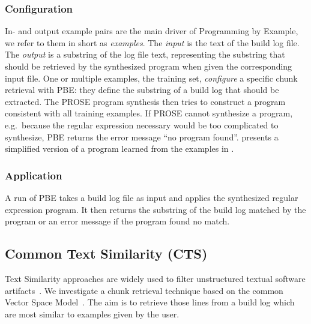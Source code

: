 \subsubsection{Configuration}
In- and output example pairs are the main driver of Programming by
Example, we refer to them in short as \emph{examples}.
The \emph{input} is the text of the build log file.
The \emph{output} is
a substring of the log file text, representing the
substring that should be retrieved by the synthesized program when
given the corresponding input file.
One or multiple examples, the
training set, \emph{configure} a specific chunk retrieval with PBE:
they define the substring of a build log that should be extracted.
The PROSE program synthesis then tries to construct a program
consistent with all training examples.
If PROSE cannot synthesize a program, e.g.\
because the regular expression
necessary would be too complicated to synthesize, PBE returns the
error message ``no program found''.
 presents a simplified version
of a program learned from the examples in \Cref{lst:chunk-example}.

\subsubsection{Application}
A run of PBE takes a build log file as input and applies the
synthesized regular expression program.
It then returns the substring
of the build log matched by the program or an error message if the
program found no match.


\subsection{Common Text Similarity (CTS)}
\label{sec:expl-ts}
Text Similarity approaches are widely used to filter unstructured
textual software artifacts~\cite{runeson2007detection,
marcus2005recovery,antoniol2002recovering,mccarey2006recommending}.
We investigate a chunk retrieval technique based on the common
Vector Space Model~\cite{schutze2008introduction}.
The aim is to retrieve those lines from a build log which are most
similar to examples given by the user.

